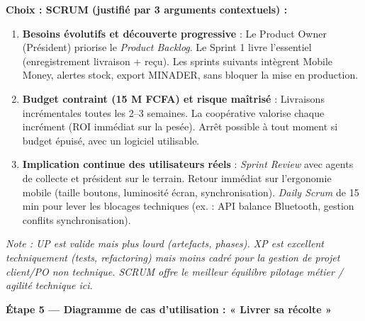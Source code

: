 \documentclass[11pt]{article}
\newcommand{\cle}[1]{{\popxbold\color{popdark}#1}}
\begin{document}
\begin{exoresolu}
\textbf{Choix : \cle{SCRUM} (justifié par 3 arguments contextuels) :}
\begin{enumerate}
\item \textbf{Besoins évolutifs et découverte progressive} : Le Product Owner (Président) priorise le \emph{Product Backlog}. Le Sprint 1 livre l'essentiel (enregistrement livraison + reçu). Les sprints suivants intègrent Mobile Money, alertes stock, export MINADER, sans bloquer la mise en production.
\item \textbf{Budget contraint (15 M FCFA) et risque maîtrisé} : Livraisons incrémentales toutes les 2--3 semaines. La coopérative valorise chaque incrément (ROI immédiat sur la pesée). Arrêt possible à tout moment si budget épuisé, avec un logiciel utilisable.
\item \textbf{Implication continue des utilisateurs réels} : \emph{Sprint Review} avec agents de collecte et président sur le terrain. Retour immédiat sur l'ergonomie mobile (taille boutons, luminosité écran, synchronisation). \emph{Daily Scrum} de 15 min pour lever les blocages techniques (ex. : API balance Bluetooth, gestion conflits synchronisation).
\end{enumerate}
\textit{Note : UP est valide mais plus lourd (artefacts, phases). XP est excellent techniquement (tests, refactoring) mais moins cadré pour la gestion de projet client/PO non technique. SCRUM offre le meilleur équilibre pilotage métier / agilité technique ici.}

\textbf{Étape 5 — Diagramme de cas d'utilisation : « Livrer sa récolte »}

\begin{popfigure}
\begin{center}
\end{center}
\end{popfigure}
\end{exoresolu}
\end{document}
